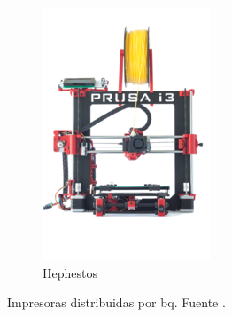 \begin{figure}[H]
\begin{subfigure}[b]{0.3\textwidth}
                            \includegraphics[width=\linewidth]{images/190px-HEPHESTOS.png}
                            \caption{Hephestos}
                            \label{fig:estado_hephestos}
                        \end{subfigure}
                        \caption{Impresoras distribuidas por bq. Fuente \cite{bq}.}
                        \label{fig:estado_impresoras_bq}
            \end{figure}

